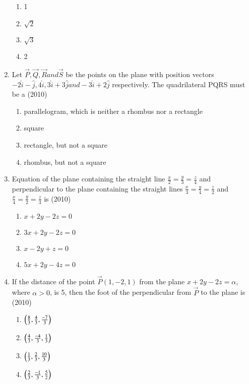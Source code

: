 \documentclass[journal,12pt,twocolumn]{IEEEtran}
\theoremstyle{remark}
\begin{document}
\begin{enumerate}
\begin{multicols}{2}
\begin{enumerate}
    \item 1
    \item $\sqrt{2}$
    \item $\sqrt{3}$
    \item 2
    \end{enumerate}
    \end{multicols}
    \item Let $\vec{P}, \vec{Q}, \vec{R} and \vec{S}$ be the points on the plane with position vectors $-2\hat{i} -\hat{j},4\hat{i},3\hat{i}+3\hat{j} and -3\hat{i}+2\hat{j}$ respectively. The quadrilateral PQRS must be a 
    \hfill{(2010)}
    \begin{enumerate}
    \item parallelogram, which is neither a rhombus nor a rectangle 
    \item square 
    \item rectangle, but not a square
    \item rhombus, but not a square 
    \end{enumerate}
    \item Equation of the plane containing the straight line $\frac{x}{2}=\frac{y}{3}=\frac{z}{4}$ and perpendicular to the plane containing the straight lines $\frac{x}{3}=\frac{y}{4}=\frac{z}{2}$ and $\frac{x}{4}=\frac{y}{2}=\frac{z}{3}$ is 
    \hfill{(2010)}
    \begin{enumerate}
    \item $x+2y-2z=0$
    \item $3x+2y-2z=0$
    \item $x-2y+z=0$
    \item $5x+2y-4z=0$
    \end{enumerate}
    \item If the distance of the point $\vec{P}(1,-2,1)$ from the plane $x+2y-2z=\alpha$, where $\alpha>0$, is 5, then the foot of the perpendicular from $\vec{P}$ to the plane is
    \hfill{(2010)}
    \begin{enumerate}
    \item $\left(\frac{8}{3}, \frac{4}{3}, \frac{-7}{3}\right)$
    \item $\left(\frac{4}{3}, \frac{-4}{3}, \frac{1}{3}\right)$
    \item $\left(\frac{1}{3}, \frac{2}{3}, \frac{10}{3}\right)$
    \item $\left(\frac{2}{3}, \frac{-1}{3}, \frac{5}{2}\right)$
    \end{enumerate}
    


\end{enumerate}
\end{document}
